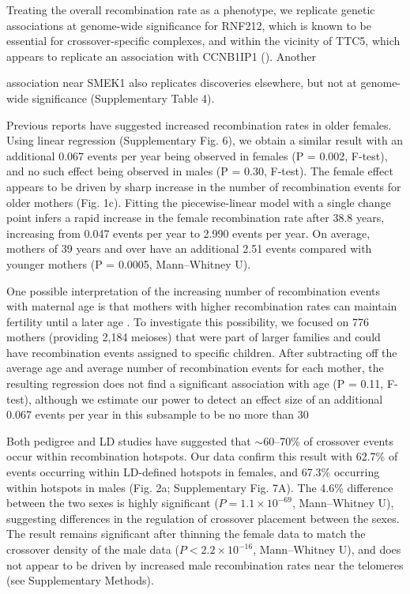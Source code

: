 Treating the overall recombination rate as a phenotype, we
replicate genetic associations at genome-wide significance for
RNF212, which is known to be essential for crossover-specific
complexes\cite{Reynolds2013}, and within the vicinity of TTC5, which appears
to replicate an association with CCNB1IP1 (\citet{Kong2014}). Another

association near SMEK1 also replicates discoveries elsewhere\cite{Kong2014},
but not at genome-wide significance (Supplementary Table 4).

Previous reports have suggested increased recombination rates
in older females\cite{Kong2004,Coop2008}. Using linear regression (Supplementary
Fig. 6), we obtain a similar result with an additional 0.067
events per year being observed in females (P = 0.002, F-test), and
no such effect being observed in males (P = 0.30, F-test). The
female effect appears to be driven by sharp increase in the
number of recombination events for older mothers (Fig. 1c).
Fitting the piecewise-linear model with a single change point
infers a rapid increase in the female recombination rate after 38.8
years, increasing from 0.047 events per year to 2.990 events per
year. On average, mothers of 39 years and over have an additional
2.51 events compared with younger mothers (P = 0.0005,
Mann–Whitney U).

One possible interpretation of the increasing number of
recombination events with maternal age is that mothers with
higher recombination rates can maintain fertility until a later
age\cite{Kong2004} . To investigate this possibility, we focused on 776 mothers
(providing 2,184 meioses) that were part of larger families and
could have recombination events assigned to specific children.
After subtracting off the average age and average number of
recombination events for each mother, the resulting regression
does not find a significant association with age (P = 0.11, F-test),
although we estimate our power to detect an effect size of an
additional 0.067 events per year in this subsample to be no more
than 30%

Both pedigree and LD studies have suggested that $\sim$60–70\% of
crossover events occur within recombination hotspots\cite{Coop2008,Myers2005}. Our
data confirm this result with 62.7\% of events occurring within
LD-defined hotspots in females, and 67.3\% occurring within
hotspots in males (Fig. 2a; Supplementary Fig. 7A). The 4.6\%
difference between the two sexes is highly significant
($P = 1.1 \times 10^{-69}$, Mann–Whitney U), suggesting differences in
the regulation of crossover placement between the sexes. The
result remains significant after thinning the female data to match
the crossover density of the male data ($P < 2.2 \times 10^{-16}$,
Mann–Whitney U), and does not appear to be driven by
increased male recombination rates near the telomeres (see
Supplementary Methods).

